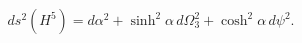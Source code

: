 \begin{equation}
ds^2(H^5)=d\alpha^2+\sinh^2\alpha\,d\Omega_3^2+\cosh^2\alpha\,d\psi^2.
\end{equation}


